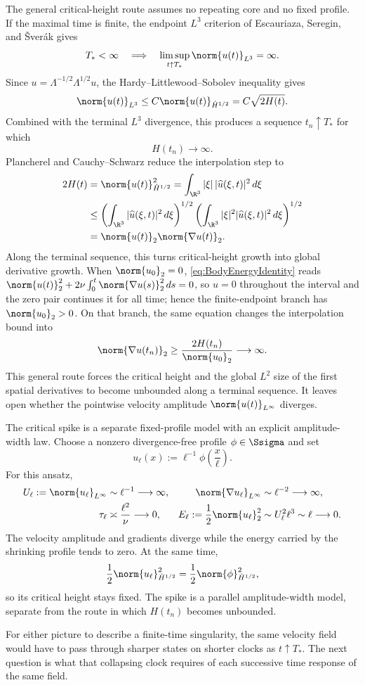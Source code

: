 The general critical-height route assumes no repeating core and no fixed profile.
If the maximal time is finite, the endpoint \(L^3\) criterion of Escauriaza, Seregin, and \v{S}ver\'ak gives \parencite{EscauriazaSereginSverak2003}
\[
  T_*<\infty
  \quad\Longrightarrow\quad
  \limsup_{t\uparrow T_*}\norm{u(t)}_{L^3}=\infty.
\]
Since \(u=\Lambda^{-1/2}\Lambda^{1/2}u\), the Hardy--Littlewood--Sobolev inequality gives \parencite[Theorem~4.3]{LiebLoss2001}
\[
  \norm{u(t)}_{L^3}
  \leq
  C\norm{u(t)}_{\dot H^{1/2}}
  =
  C\sqrt{2H(t)}.
\]
Combined with the terminal \(L^3\) divergence, this produces a sequence \(t_n\uparrow T_*\) for which
\[
  H(t_n)\longrightarrow\infty.
\]
Plancherel and Cauchy--Schwarz reduce the interpolation step to
\[
\begin{aligned}
  2H(t)
  &=
  \norm{u(t)}_{\dot H^{1/2}}^2
  =
  \int_{\R^3}|\xi|\,|\widehat u(\xi,t)|^2\,d\xi
  \\
  &\leq
  \left(\int_{\R^3}|\widehat u(\xi,t)|^2\,d\xi\right)^{1/2}
  \left(\int_{\R^3}|\xi|^2|\widehat u(\xi,t)|^2\,d\xi\right)^{1/2}
  \\
  &=
  \norm{u(t)}_2\norm{\nabla u(t)}_2.
\end{aligned}
\]
Along the terminal sequence, this turns critical-height growth into global derivative growth.
When \(\norm{u_0}_2=0\), \eqref{eq:BodyEnergyIdentity} reads \(\norm{u(t)}_2^2+2\nu\int_0^t\norm{\nabla u(s)}_2^2\,ds=0\), so \(u=0\) throughout the interval and the zero pair continues it for all time; hence the finite-endpoint branch has \(\norm{u_0}_2>0\).
On that branch, the same equation changes the interpolation bound into
\[
  \norm{\nabla u(t_n)}_2
  \geq
  \frac{2H(t_n)}{\norm{u_0}_2}
  \longrightarrow
  \infty.
\]
This general route forces the critical height and the global \(L^2\) size of the first spatial derivatives to become unbounded along a terminal sequence.
It leaves open whether the pointwise velocity amplitude \(\norm{u(t)}_{L^\infty}\) diverges.

The critical spike is a separate fixed-profile model with an explicit amplitude-width law.
Choose a nonzero divergence-free profile \(\phi\in\Ssigma\) and set
\[
  u_\ell(x)
  :=
  \ell^{-1}\phi\!\left(\frac{x}{\ell}\right).
\]
For this ansatz,
\[
\begin{aligned}
  U_\ell
  :=
  \norm{u_\ell}_{L^\infty}
  &\sim
  \ell^{-1}
  \longrightarrow
  \infty,
  &
  \norm{\nabla u_\ell}_{L^\infty}
  &\sim
  \ell^{-2}
  \longrightarrow
  \infty,
  \\
  \tau_\ell
  &\asymp
  \frac{\ell^2}{\nu}
  \longrightarrow
  0,
  &
  E_\ell
  :=
  \frac12\norm{u_\ell}_2^2
  &\sim
  U_\ell^2\ell^3
  \sim
  \ell
  \longrightarrow
  0.
\end{aligned}
\]
The velocity amplitude and gradients diverge while the energy carried by the shrinking profile tends to zero.
At the same time,
\[
  \frac12\norm{u_\ell}_{\dot H^{1/2}}^2
  =
  \frac12\norm{\phi}_{\dot H^{1/2}}^2,
\]
so its critical height stays fixed.
The spike is a parallel amplitude-width model, separate from the route in which \(H(t_n)\) becomes unbounded.

For either picture to describe a finite-time singularity, the same velocity field would have to pass through sharper states on shorter clocks as \(t\uparrow T_*\).
The next question is what that collapsing clock requires of each successive time response of the same field.
